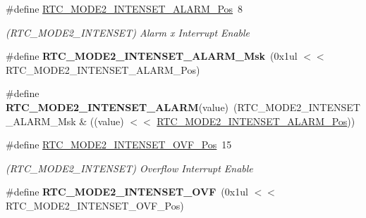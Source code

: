 \begin{DoxyCompactItemize}
\item 
\hypertarget{group___s_a_m_l21___r_t_c_ga1158f1401ff9907c83fda3c449162e18}{}\#define \hyperlink{group___s_a_m_l21___r_t_c_ga1158f1401ff9907c83fda3c449162e18}{R\+T\+C\+\_\+\+M\+O\+D\+E2\+\_\+\+I\+N\+T\+E\+N\+S\+E\+T\+\_\+\+A\+L\+A\+R\+M\+\_\+\+Pos}~8\label{group___s_a_m_l21___r_t_c_ga1158f1401ff9907c83fda3c449162e18}

\begin{DoxyCompactList}\small\item\em (R\+T\+C\+\_\+\+M\+O\+D\+E2\+\_\+\+I\+N\+T\+E\+N\+S\+E\+T) Alarm x Interrupt Enable \end{DoxyCompactList}\item 
\hypertarget{group___s_a_m_l21___r_t_c_ga399cab412d12907e9ec83e773af56fa6}{}\#define {\bfseries R\+T\+C\+\_\+\+M\+O\+D\+E2\+\_\+\+I\+N\+T\+E\+N\+S\+E\+T\+\_\+\+A\+L\+A\+R\+M\+\_\+\+Msk}~(0x1ul $<$$<$ R\+T\+C\+\_\+\+M\+O\+D\+E2\+\_\+\+I\+N\+T\+E\+N\+S\+E\+T\+\_\+\+A\+L\+A\+R\+M\+\_\+\+Pos)\label{group___s_a_m_l21___r_t_c_ga399cab412d12907e9ec83e773af56fa6}

\item 
\hypertarget{group___s_a_m_l21___r_t_c_ga9addc173b583e16aac0822df06005cbe}{}\#define {\bfseries R\+T\+C\+\_\+\+M\+O\+D\+E2\+\_\+\+I\+N\+T\+E\+N\+S\+E\+T\+\_\+\+A\+L\+A\+R\+M}(value)~(R\+T\+C\+\_\+\+M\+O\+D\+E2\+\_\+\+I\+N\+T\+E\+N\+S\+E\+T\+\_\+\+A\+L\+A\+R\+M\+\_\+\+Msk \& ((value) $<$$<$ \hyperlink{group___s_a_m_l21___r_t_c_ga1158f1401ff9907c83fda3c449162e18}{R\+T\+C\+\_\+\+M\+O\+D\+E2\+\_\+\+I\+N\+T\+E\+N\+S\+E\+T\+\_\+\+A\+L\+A\+R\+M\+\_\+\+Pos}))\label{group___s_a_m_l21___r_t_c_ga9addc173b583e16aac0822df06005cbe}

\item 
\hypertarget{group___s_a_m_l21___r_t_c_ga8fec704078b27c1e1411d25333f55f1d}{}\#define \hyperlink{group___s_a_m_l21___r_t_c_ga8fec704078b27c1e1411d25333f55f1d}{R\+T\+C\+\_\+\+M\+O\+D\+E2\+\_\+\+I\+N\+T\+E\+N\+S\+E\+T\+\_\+\+O\+V\+F\+\_\+\+Pos}~15\label{group___s_a_m_l21___r_t_c_ga8fec704078b27c1e1411d25333f55f1d}

\begin{DoxyCompactList}\small\item\em (R\+T\+C\+\_\+\+M\+O\+D\+E2\+\_\+\+I\+N\+T\+E\+N\+S\+E\+T) Overflow Interrupt Enable \end{DoxyCompactList}\item 
\hypertarget{group___s_a_m_l21___r_t_c_ga2fa2499c5ea7eef57b3ef1f5a7e4e37b}{}\#define {\bfseries R\+T\+C\+\_\+\+M\+O\+D\+E2\+\_\+\+I\+N\+T\+E\+N\+S\+E\+T\+\_\+\+O\+V\+F}~(0x1ul $<$$<$ R\+T\+C\+\_\+\+M\+O\+D\+E2\+\_\+\+I\+N\+T\+E\+N\+S\+E\+T\+\_\+\+O\+V\+F\+\_\+\+Pos)\label{group___s_a_m_l21___r_t_c_ga2fa2499c5ea7eef57b3ef1f5a7e4e37b}


\end{DoxyCompactItemize}
